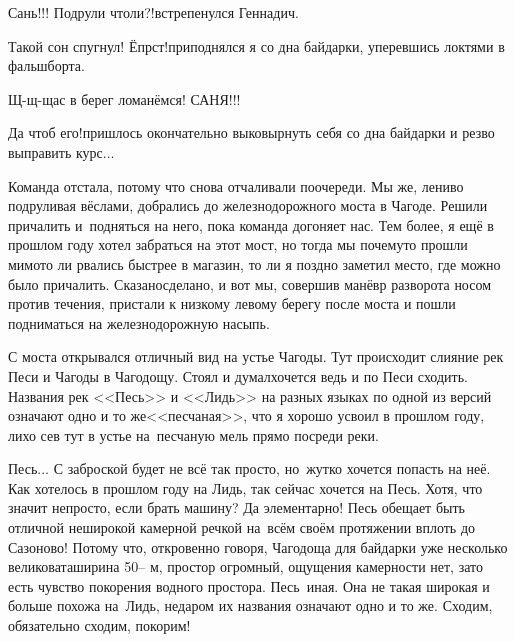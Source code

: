 \diagdash Сань!!! Подрули чтоли?!\mdash встрепенулся Геннадич.

\diagdash Такой сон спугнул! Ёпрст!\mdash приподнялся я со дна байдарки, уперевшись локтями в фальшборта.

\diagdash Щ-щ-щас в берег ломанёмся! САНЯ!!!

\diagdash Да чтоб его!\mdash пришлось окончательно выковырнуть себя со дна байдарки и резво выправить курс$\ldots$

Команда отстала, потому что снова отчаливали по\sdash очереди. Мы же, лениво подруливая вёслами, добрались до железнодорожного моста в Чагоде. Решили причалить и~подняться на него, пока команда догоняет нас. Тем более, я ещё в прошлом году хотел забраться на этот мост, но тогда мы почему\sdash то прошли мимо\mdash то ли рвались быстрее в магазин, то ли я поздно заметил место, где можно было причалить. Сказано\mdash сделано, и вот мы, совершив манёвр разворота носом против течения, пристали к низкому левому берегу после моста и пошли подниматься на железнодорожную насыпь.

С моста открывался отличный вид на устье Чагоды. Тут происходит слияние рек Песи и Чагоды в Чагодощу. Стоял и думал\mdash хочется ведь и по Песи сходить. Названия рек <<Песь>> и <<Лидь>> на разных языках по одной из версий означают одно и то же\mdash <<песчаная>>\cite{ЧагодаАльманахКузнецов}, что я хорошо усвоил в прошлом году, лихо сев тут в устье на~песчаную мель прямо посреди реки. 

Песь$\ldots$ С заброской будет не всё так просто, но~жутко хочется попасть на неё. Как хотелось в прошлом году на Лидь, так сейчас хочется на Песь. Хотя, что значит непросто, если брать машину? Да элементарно! 
Песь обещает быть отличной неширокой камерной речкой на~всём своём протяжении вплоть до Сазоново! Потому что, откровенно говоря, Чагодоща для байдарки уже несколько великовата\mdash ширина 50\thinspace\nobreakdash-- м, простор огромный, ощущения камерности нет, зато есть чувство покорения водного простора. Песь~иная. Она не такая широкая и больше похожа на~Лидь, недаром их названия означают одно и то же. Сходим, обязательно сходим, покорим!

